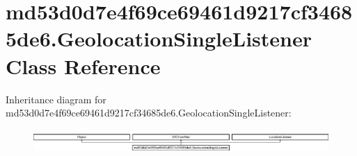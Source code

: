 \hypertarget{classmd53d0d7e4f69ce69461d9217cf34685de6_1_1GeolocationSingleListener}{}\section{md53d0d7e4f69ce69461d9217cf34685de6.\+Geolocation\+Single\+Listener Class Reference}
\label{classmd53d0d7e4f69ce69461d9217cf34685de6_1_1GeolocationSingleListener}
Inheritance diagram for md53d0d7e4f69ce69461d9217cf34685de6.\+Geolocation\+Single\+Listener\+:\begin{figure}[H]
\begin{center}
\leavevmode
\includegraphics[height=0.906149cm]{classmd53d0d7e4f69ce69461d9217cf34685de6_1_1GeolocationSingleListener}
\end{center}
\end{figure}
